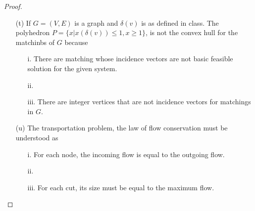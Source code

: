 \begin{proof}
\begin{itemize}
        \item[(t)] If $G = (V, E)$ is a graph and $\delta(v)$ is as defined in class. The polyhedron
                 $P = \{ x | x(\delta(v)) \leq 1, x \geq 1 \}$, is not the convex hull for the
                 matchinbs of $G$ because
                    \begin{itemize}
                        \item[i.] There are matching whose incidence vectors are not basic feasible solution
                                    for the given system.
                        \item[ii.] 
                        \item[iii.] There are integer vertices that are not incidence vectors for matchings in $G$.
                    \end{itemize}

        \item[(u)] The transportation problem, the law of flow conservation must be understood as
                    \begin{itemize}
                        \item[i.] For each node, the  incoming flow is equal to the outgoing flow.
                        \item[ii.] 
                        \item[iii.] For each cut, its size must be equal to the maximum flow.
                    \end{itemize}
    \end{itemize}
\end{proof}